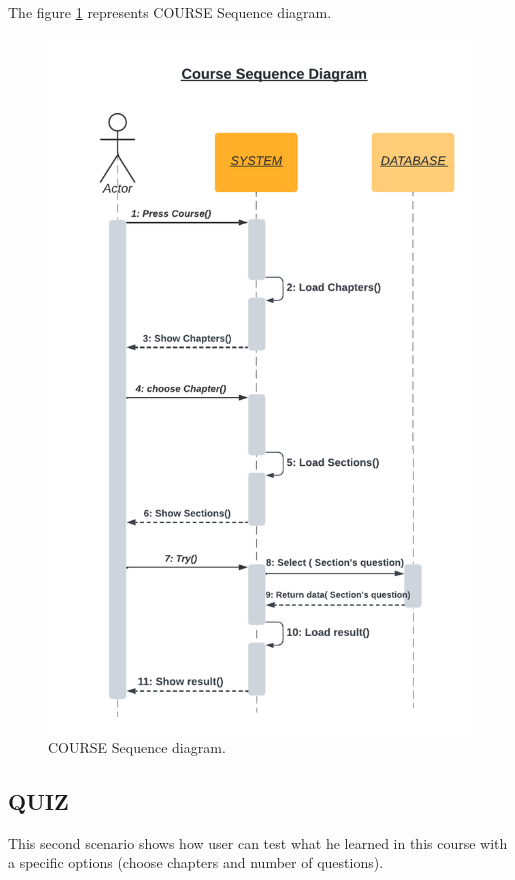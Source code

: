 \newpage
The figure \ref{fig:COURSE DS} represents COURSE Sequence diagram.
\begin{figure}[ht]
	\centering
	\label{}\includegraphics[scale=0.6]{img/Course Sequence diagram.pdf}                
	\caption{COURSE Sequence diagram.} 
	\label{fig:COURSE DS}
\end{figure} 






\subsection{QUIZ}
This second scenario shows how user can test what he learned in this course with a specific options (choose chapters and number of questions).
\newpage


